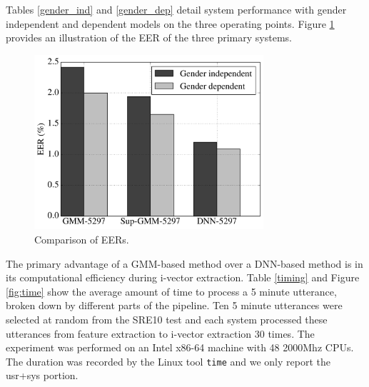 \documentclass{article}
\begin{document}
Tables \ref{gender_ind} and \ref{gender_dep} detail system
performance with gender independent and dependent models on the three
operating points. Figure \ref{fig:eer} provides an illustration of the
EER of the three primary systems. 



\begin{figure}[t]
\centerline{\includegraphics[width=8.5cm]{fig/eer}}
\caption{Comparison of EERs.}
\label{fig:eer}
\end{figure}



The primary advantage of a GMM-based method over a DNN-based method is
in its computational efficiency during i-vector extraction. Table \ref{timing} and 
Figure \ref{fig:time} show the average amount of
time to process a 5 minute utterance, broken down by different
parts of the pipeline. Ten 5 minute utterances were selected at random from the SRE10 test and each system
processed these utterances from feature extraction to i-vector extraction
30 times. The experiment was performed on an
 Intel x86-64 machine with 48 2000Mhz
CPUs. The duration was recorded by the Linux
tool \texttt{time} and we only report the usr+sys portion. 
\end{document}
